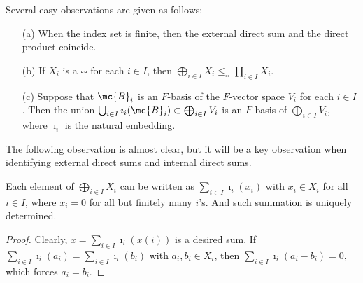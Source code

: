 Several easy observations are given as follows:
\begin{obs}
    \begin{enumerate}
        \item[(a)]
        {
            When the index set is finite, then the external direct sum and the direct product coincide.
        }
        \item[(b)]
        {
            If $X_i$ is a $\square\square$ for each $i\in I$, then $\bigoplus_{i\in I} X_i\leq_{\square\square}\prod_{i\in I} X_i$.
        }
        \item[(c)]
        {
            Suppose that $\mc{B}_i$ is an $F$-basis of the $F$-vector space $V_i$ for each $i\in I$.
            Then the union $\bigcup_{i\in I}\imath_i(\mc{B}_i)\subset\bigoplus_{i\in I} V_i$ is an $F$-basis of $\bigoplus_{i\in I} V_i$, where $\imath_i$ is the natural embedding.
        }
    \end{enumerate}
\end{obs}

The following observation is almost clear, but it will be a key observation when identifying external direct sums and internal direct sums.
\begin{obs}
    Each element of $\bigoplus_{i\in I} X_i$ can be written as $\sum_{i\in I} \imath_i(x_i)$ with $x_i\in X_i$ for all $i\in I$, where $x_i=0$ for all but finitely many $i$'s.
    And such summation is uniquely determined.
\end{obs}
\begin{proof}
    Clearly, $x=\sum_{i\in I} \imath_i(x(i))$ is a desired sum.
    If $\sum_{i\in I} \imath_i(a_i)=\sum_{i\in I} \imath_i(b_i)$ with $a_i, b_i\in X_i$, then $\sum_{i\in I} \imath_i(a_i-b_i)=0$, which forces $a_i=b_i$.
\end{proof}


